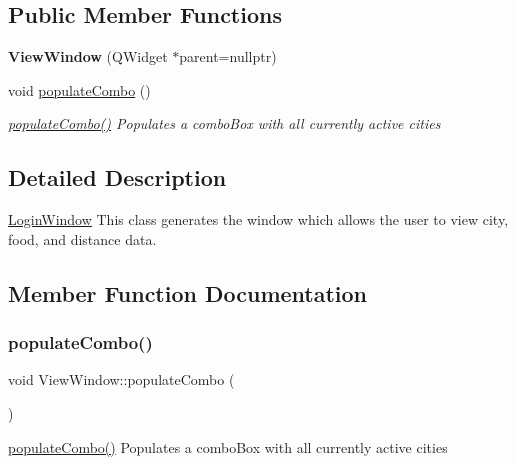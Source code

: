 \subsection*{Public Member Functions}
\begin{DoxyCompactItemize}
\item 
\mbox{\label{class_view_window_a6a50ff7682c6a5286212470306fbb72d}} 
{\bfseries View\+Window} (Q\+Widget $\ast$parent=nullptr)
\item 
void \mbox{\hyperlink{class_view_window_ae95bf3c78fb5374f9d4e62405db6d94c}{populate\+Combo}} ()
\begin{DoxyCompactList}\small\item\em \mbox{\hyperlink{class_view_window_ae95bf3c78fb5374f9d4e62405db6d94c}{populate\+Combo()}} Populates a combo\+Box with all currently active cities \end{DoxyCompactList}\end{DoxyCompactItemize}


\subsection{Detailed Description}
\mbox{\hyperlink{class_login_window}{Login\+Window}} This class generates the window which allows the user to view city, food, and distance data. 

\subsection{Member Function Documentation}
\mbox{\label{class_view_window_ae95bf3c78fb5374f9d4e62405db6d94c}} 
\subsubsection{\texorpdfstring{populateCombo()}{populateCombo()}}
{\footnotesize\ttfamily void View\+Window\+::populate\+Combo (\begin{DoxyParamCaption}{ }\end{DoxyParamCaption})}



\mbox{\hyperlink{class_view_window_ae95bf3c78fb5374f9d4e62405db6d94c}{populate\+Combo()}} Populates a combo\+Box with all currently active cities 

